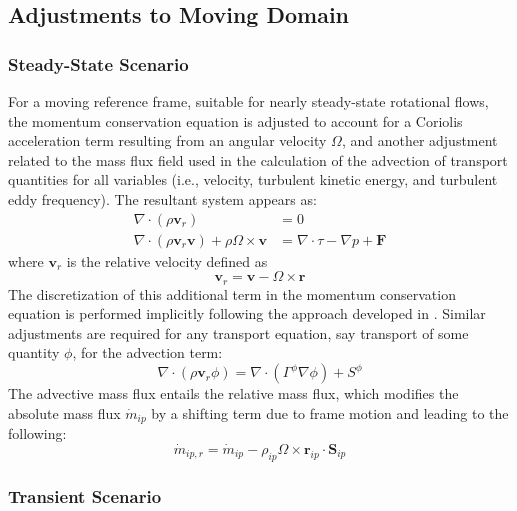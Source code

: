 \documentclass[12pt]{extarticle}
\newcommand{\<}{\langle}
\renewcommand{\>}{\rangle}
\theoremstyle{definition}
\begin{document}
\subsection{Adjustments to Moving Domain}

\subsubsection{Steady-State Scenario}

For a moving reference frame, suitable for nearly steady-state rotational flows, the momentum conservation equation is adjusted to account for a Coriolis acceleration term resulting from an angular velocity $\Omega$, and another adjustment related to the mass flux field used in the calculation of the advection of transport quantities for all variables (i.e., velocity, turbulent kinetic energy, and turbulent eddy frequency). The resultant system appears as:
\begin{align}
\nabla \cdot (\rho \textbf{v}_{r}) &= 0 \label{eq:cont_full_mfr} \\
\nabla \cdot (\rho \textbf{v}_{r} \textbf{v}) + \rho\Omega \times \textbf{v} &= \nabla \cdot \tau - \nabla p + \textbf{F}\label{eq:mom_full_mfr}
\end{align}
where $\textbf{v}_r$ is the relative velocity defined as
\begin{equation}
    \textbf{v}_r = \textbf{v} - \Omega \times \textbf{r}
\end{equation}
The discretization of this additional term in the momentum conservation equation is performed implicitly following the approach developed in \cite{mangani2014development}. Similar adjustments are required for any transport equation, say transport of some quantity $\phi$, for the advection term:
\begin{equation}
    \nabla \cdot (\rho \textbf{v}_{r} \phi) = \nabla \cdot \left(\Gamma^{\phi} \nabla \phi \right) + S^{\phi}\label{eq:sca_eq_mfr}
\end{equation}
The advective mass flux entails the relative mass flux, which modifies the absolute mass flux $\dot{m}_{ip}$ by a shifting term due to frame motion and leading to the following:   
\begin{equation}
    \dot{m}_{ip,r} = \dot{m}_{ip} - \rho_{ip} \Omega \times \textbf{r}_{ip} \cdot \textbf{S}_{ip}
    \label{rhie_chow_relative}
\end{equation}

\subsubsection{Transient Scenario}
\end{document}
